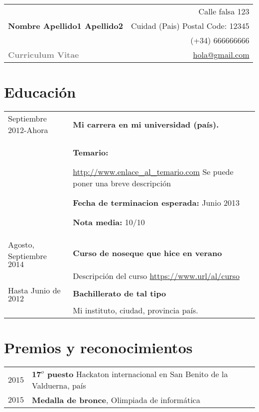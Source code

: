 \documentclass[11pt]{article}
\begin{document}
\begin{tabular}{l r}

\multirow{3}{*}{\Huge \textbf{Nombre Apellido1 Apellido2}} 

										& \small Calle falsa 123 \\
										& \small Cuidad (Pais) Postal Code: 12345\\
										& \small \Mobilefone \ \ (+34) 666666666 \\
\huge \textcolor{gray}{\textbf{Curriculum Vitae}}					&\small \Letter \ \ \href{mailto:hola@gmail.com}{hola@gmail.com}

\end{tabular}


\section*{Educación}
	
\begin{tabular}{p{2cm} p{13.5cm}}	
Septiembre $2012$-Ahora		& \textbf{Mi carrera en mi universidad (país). } 
\\
							& \textbf{Temario:}
							
							\url{http://www.enlace_al_temario.com} Se puede poner una breve descripción
							
							\textbf{Fecha de terminacion esperada:} Junio 2013 
							
							\textbf{Nota media:} 10/10
\\

Agosto, Septiembre $2014$ 	& \textbf{Curso de noseque que hice en verano}
\\
							& Descripción del curso \url{https://www.url/al/curso}
\\

Hasta Junio de $2012$ 			& \textbf{Bachillerato de tal tipo} 
\\

							& Mi instituto, ciudad, provincia país.
\\
\end{tabular}

\section*{Premios y reconocimientos} %
\begin{tabular}{r p{14cm}}
$2015$ & \textbf{$\textbf{17}^{o}$ puesto} Hackaton internacional en San Benito de la Valduerna, país
\\

$2015$ &\textbf{Medalla de bronce}, Olimpiada de informática
\\
\end{tabular}
\end{document}
